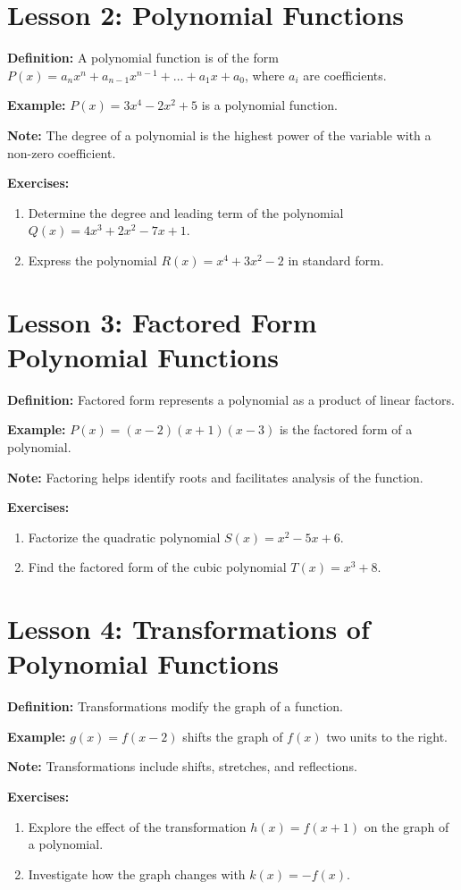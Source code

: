 \documentclass{article}
\newcommand{\colorsection}[1]{\section*{\textcolor{lessoncolor}{#1}}}
\begin{document}
\colorsection{Lesson 2: Polynomial Functions}

\textbf{Definition:} A polynomial function is of the form \( P(x) = a_nx^n + a_{n-1}x^{n-1} + \ldots + a_1x + a_0 \), where \( a_i \) are coefficients.

\textbf{Example:} \( P(x) = 3x^4 - 2x^2 + 5 \) is a polynomial function.

\textbf{Note:} The degree of a polynomial is the highest power of the variable with a non-zero coefficient.

\textbf{Exercises:}
\begin{enumerate}
    \item Determine the degree and leading term of the polynomial \( Q(x) = 4x^3 + 2x^2 - 7x + 1 \).
    \item Express the polynomial \( R(x) = x^4 + 3x^2 - 2 \) in standard form.
\end{enumerate}

\colorsection{Lesson 3: Factored Form Polynomial Functions}

\textbf{Definition:} Factored form represents a polynomial as a product of linear factors.

\textbf{Example:} \( P(x) = (x - 2)(x + 1)(x - 3) \) is the factored form of a polynomial.

\textbf{Note:} Factoring helps identify roots and facilitates analysis of the function.

\textbf{Exercises:}
\begin{enumerate}
    \item Factorize the quadratic polynomial \( S(x) = x^2 - 5x + 6 \).
    \item Find the factored form of the cubic polynomial \( T(x) = x^3 + 8 \).
\end{enumerate}

\colorsection{Lesson 4: Transformations of Polynomial Functions}

\textbf{Definition:} Transformations modify the graph of a function.

\textbf{Example:} \( g(x) = f(x - 2) \) shifts the graph of \( f(x) \) two units to the right.

\textbf{Note:} Transformations include shifts, stretches, and reflections.

\textbf{Exercises:}
\begin{enumerate}
    \item Explore the effect of the transformation \( h(x) = f(x + 1) \) on the graph of a polynomial.
    \item Investigate how the graph changes with \( k(x) = -f(x) \).
\end{enumerate}
\end{document}
